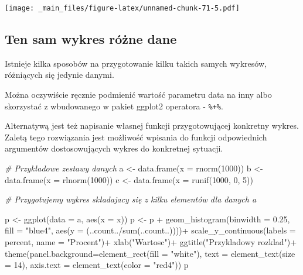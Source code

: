 \documentclass[
]{book}
\newenvironment{Shaded}{\begin{snugshade}}{\end{snugshade}}
\newcommand{\AttributeTok}[1]{\textcolor[rgb]{0.77,0.63,0.00}{#1}}
\newcommand{\CommentTok}[1]{\textcolor[rgb]{0.56,0.35,0.01}{\textit{#1}}}
\newcommand{\DecValTok}[1]{\textcolor[rgb]{0.00,0.00,0.81}{#1}}
\newcommand{\FloatTok}[1]{\textcolor[rgb]{0.00,0.00,0.81}{#1}}
\newcommand{\FunctionTok}[1]{\textcolor[rgb]{0.00,0.00,0.00}{#1}}
\newcommand{\NormalTok}[1]{#1}
\newcommand{\OtherTok}[1]{\textcolor[rgb]{0.56,0.35,0.01}{#1}}
\newcommand{\SpecialCharTok}[1]{\textcolor[rgb]{0.00,0.00,0.00}{#1}}
\newcommand{\StringTok}[1]{\textcolor[rgb]{0.31,0.60,0.02}{#1}}
\begin{document}
\texttt{[image: \_main\_files/figure-latex/unnamed-chunk-71-5.pdf]}

\hypertarget{ten-sam-wykres-ruxf3ux17cne-dane}{%
\subsection{Ten sam wykres różne dane}\label{ten-sam-wykres-ruxf3ux17cne-dane}}

Istnieje kilka sposobów na przygotowanie kilku takich samych wykresów, różniących się jedynie danymi.

Można oczywiście ręcznie podmienić wartość parametru data na inny albo skorzystać z wbudowanego w pakiet ggplot2 operatora - \texttt{\%+\%}.

Alternatywą jest też napisanie własnej funkcji przygotowującej konkretny wykres. Zaletą tego rozwiązania jest możliwość wpisania do funkcji odpowiednich argumentów dostosowujących wykres do konkretnej sytuacji.

\begin{Shaded}
\begin{Highlighting}[]
\CommentTok{\# Przykładowe zestawy danych}
\NormalTok{a }\OtherTok{\textless{}{-}} \FunctionTok{data.frame}\NormalTok{(}\AttributeTok{x =} \FunctionTok{rnorm}\NormalTok{(}\DecValTok{1000}\NormalTok{))}
\NormalTok{b }\OtherTok{\textless{}{-}} \FunctionTok{data.frame}\NormalTok{(}\AttributeTok{x =} \FunctionTok{rlnorm}\NormalTok{(}\DecValTok{1000}\NormalTok{))}
\NormalTok{c }\OtherTok{\textless{}{-}} \FunctionTok{data.frame}\NormalTok{(}\AttributeTok{x =} \FunctionTok{runif}\NormalTok{(}\DecValTok{1000}\NormalTok{, }\DecValTok{0}\NormalTok{, }\DecValTok{5}\NormalTok{))}

\CommentTok{\# Przygotujemy wykres składajacy się z kilku elementów dla danych a}

\NormalTok{p }\OtherTok{\textless{}{-}} \FunctionTok{ggplot}\NormalTok{(}\AttributeTok{data =}\NormalTok{ a, }\FunctionTok{aes}\NormalTok{(}\AttributeTok{x =}\NormalTok{ x))}
\NormalTok{p }\OtherTok{\textless{}{-}}\NormalTok{ p }\SpecialCharTok{+} \FunctionTok{geom\_histogram}\NormalTok{(}\AttributeTok{binwidth =} \FloatTok{0.25}\NormalTok{, }\AttributeTok{fill =} \StringTok{"blue4"}\NormalTok{, }\FunctionTok{aes}\NormalTok{(}\AttributeTok{y =}\NormalTok{ (..count..}\SpecialCharTok{/}\FunctionTok{sum}\NormalTok{(..count..))))}\SpecialCharTok{+}
  \FunctionTok{scale\_y\_continuous}\NormalTok{(}\AttributeTok{labels =}\NormalTok{ percent, }\AttributeTok{name =} \StringTok{"Procent"}\NormalTok{)}\SpecialCharTok{+}
  \FunctionTok{xlab}\NormalTok{(}\StringTok{"Wartosc"}\NormalTok{)}\SpecialCharTok{+}
  \FunctionTok{ggtitle}\NormalTok{(}\StringTok{"Przykladowy rozklad"}\NormalTok{)}\SpecialCharTok{+}
  \FunctionTok{theme}\NormalTok{(}\AttributeTok{panel.background=}\FunctionTok{element\_rect}\NormalTok{(}\AttributeTok{fill =} \StringTok{"white"}\NormalTok{), }\AttributeTok{text =} \FunctionTok{element\_text}\NormalTok{(}\AttributeTok{size =} \DecValTok{14}\NormalTok{), }
        \AttributeTok{axis.text =} \FunctionTok{element\_text}\NormalTok{(}\AttributeTok{color =} \StringTok{"red4"}\NormalTok{))}
\NormalTok{p}
\end{Highlighting}
\end{Shaded}
\end{document}
